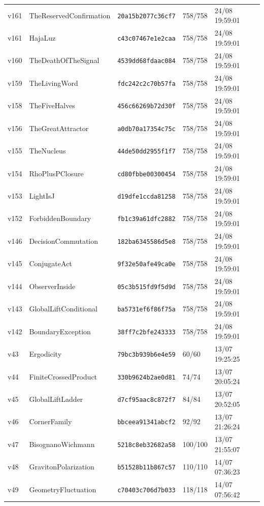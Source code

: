 \documentclass[11pt]{article}
\theoremstyle{definition}\newtheorem{deriv}{Derivação}
\begin{document}
{\begin{longtable}{@{}lllll@{}}
v161 & TheReservedConfirmation & \texttt{20a15b2077c36cf7} & 758/758 & 24/08 19:59:01 \\
v161 & HajaLuz & \texttt{c43c07467e1e2caa} & 758/758 & 24/08 19:59:01 \\
v160 & TheDeathOfTheSignal & \texttt{4539dd68fdaac084} & 758/758 & 24/08 19:59:01 \\
v159 & TheLivingWord & \texttt{fdc242c2c70b57fa} & 758/758 & 24/08 19:59:01 \\
v158 & TheFiveHalves & \texttt{456c66269b72d30f} & 758/758 & 24/08 19:59:01 \\
v156 & TheGreatAttractor & \texttt{a0db70a17354c75c} & 758/758 & 24/08 19:59:01 \\
v155 & TheNucleus & \texttt{44de50dd2955f1f7} & 758/758 & 24/08 19:59:01 \\
v154 & RhoPlusPClosure & \texttt{cd80fbbe00300454} & 758/758 & 24/08 19:59:01 \\
v153 & LightIsJ & \texttt{d19dfe1ccda81258} & 758/758 & 24/08 19:59:01 \\
v152 & ForbiddenBoundary & \texttt{fb1c39a61dfc2882} & 758/758 & 24/08 19:59:01 \\
v146 & DecisionCommutation & \texttt{182ba6345586d5e8} & 758/758 & 24/08 19:59:01 \\
v145 & ConjugateAct & \texttt{9f32e50afe49ca0e} & 758/758 & 24/08 19:59:01 \\
v144 & ObserverInside & \texttt{05c3b515fd9f5d9d} & 758/758 & 24/08 19:59:01 \\
v143 & GlobalLiftConditional & \texttt{ba5731ef6f86f75a} & 758/758 & 24/08 19:59:01 \\
v142 & BoundaryException & \texttt{38ff7c2bfe243333} & 758/758 & 24/08 19:59:01 \\
v43 & Ergodicity & \texttt{79bc3b939b6e4e59} & 60/60 & 13/07 19:25:25 \\
v44 & FiniteCrossedProduct & \texttt{330b9624b2ae0d81} & 74/74 & 13/07 20:05:24 \\
v45 & GlobalLiftLadder & \texttt{d7cf95aac8c872f7} & 84/84 & 13/07 20:52:05 \\
v46 & CornerFamily & \texttt{bbceea91341abcf2} & 92/92 & 13/07 21:26:24 \\
v47 & BisognanoWichmann & \texttt{5218c8eb32682a58} & 100/100 & 13/07 21:55:07 \\
v48 & GravitonPolarization & \texttt{b51528b11b867c57} & 110/110 & 14/07 07:36:23 \\
v49 & GeometryFluctuation & \texttt{c70403c706d7b033} & 118/118 & 14/07 07:56:42 \\

\end{longtable}}
\end{document}
